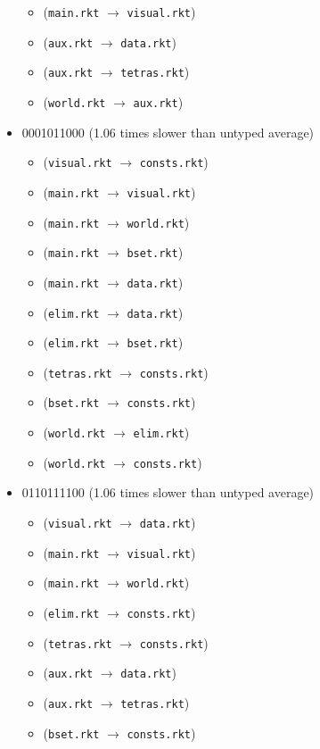 \documentclass{article}
\newcommand{\mono}[1]{\texttt{#1}}
\begin{document}
\begin{itemize}
\begin{itemize}
  \item (\mono{main.rkt} $\rightarrow$ \mono{visual.rkt})
  \item (\mono{aux.rkt} $\rightarrow$ \mono{data.rkt})
  \item (\mono{aux.rkt} $\rightarrow$ \mono{tetras.rkt})
  \item (\mono{world.rkt} $\rightarrow$ \mono{aux.rkt})
  \end{itemize}
\item 0001011000 (1.06 times slower than untyped average)
  \begin{itemize}
  \item (\mono{visual.rkt} $\rightarrow$ \mono{consts.rkt})
  \item (\mono{main.rkt} $\rightarrow$ \mono{visual.rkt})
  \item (\mono{main.rkt} $\rightarrow$ \mono{world.rkt})
  \item (\mono{main.rkt} $\rightarrow$ \mono{bset.rkt})
  \item (\mono{main.rkt} $\rightarrow$ \mono{data.rkt})
  \item (\mono{elim.rkt} $\rightarrow$ \mono{data.rkt})
  \item (\mono{elim.rkt} $\rightarrow$ \mono{bset.rkt})
  \item (\mono{tetras.rkt} $\rightarrow$ \mono{consts.rkt})
  \item (\mono{bset.rkt} $\rightarrow$ \mono{consts.rkt})
  \item (\mono{world.rkt} $\rightarrow$ \mono{elim.rkt})
  \item (\mono{world.rkt} $\rightarrow$ \mono{consts.rkt})
  \end{itemize}
\item 0110111100 (1.06 times slower than untyped average)
  \begin{itemize}
  \item (\mono{visual.rkt} $\rightarrow$ \mono{data.rkt})
  \item (\mono{main.rkt} $\rightarrow$ \mono{visual.rkt})
  \item (\mono{main.rkt} $\rightarrow$ \mono{world.rkt})
  \item (\mono{elim.rkt} $\rightarrow$ \mono{consts.rkt})
  \item (\mono{tetras.rkt} $\rightarrow$ \mono{consts.rkt})
  \item (\mono{aux.rkt} $\rightarrow$ \mono{data.rkt})
  \item (\mono{aux.rkt} $\rightarrow$ \mono{tetras.rkt})
  \item (\mono{bset.rkt} $\rightarrow$ \mono{consts.rkt})

\end{itemize}
\end{itemize}
\end{document}
